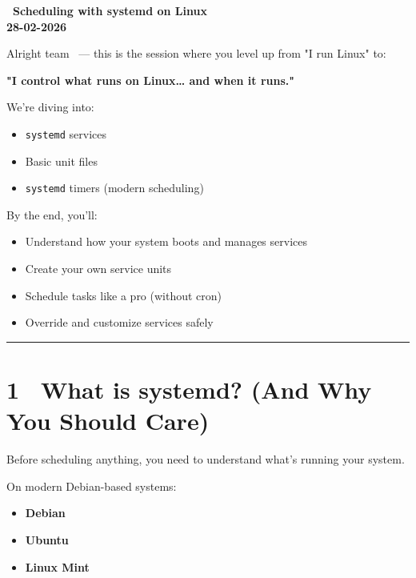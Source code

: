 \documentclass[12pt]{article}
\newcommand{\courseTitle}{Scheduling with systemd on Linux}
\newcommand{\courseDate}{28-02-2026}
\newcommand{\systemdicon}{\faCogs}
\begin{document}
\begin{center}
\headingfont\Huge\bfseries\color{navy}
\systemdicon\ \courseTitle\\[0.5em]
\Large\color{teamred}
\courseDate
\end{center}

\begin{infobox}
Alright team \faUserTie\ — this is the session where you level up from "I run Linux" to:

\begin{center}
\large\textbf{"I control what runs on Linux… and when it runs."}
\end{center}
\end{infobox}

We're diving into:

\begin{itemize}
    \item \texttt{systemd} services
    \item Basic unit files
    \item \texttt{systemd} timers (modern scheduling)
\end{itemize}

By the end, you'll:

\begin{itemize}
    \item Understand how your system boots and manages services
    \item Create your own service units
    \item Schedule tasks like a pro (without cron)
    \item Override and customize services safely
\end{itemize}

\vspace{1em}
\begin{center}
\color{teamred}\rule{0.8\textwidth}{1pt}
\end{center}

\section*{1 \faInfoCircle\ What is systemd? (And Why You Should Care)}

Before scheduling anything, you need to understand what's running your system.

On modern Debian-based systems:

\begin{itemize}
    \item \textbf{Debian}
    \item \textbf{Ubuntu}
    \item \textbf{Linux Mint}
\end{itemize}
\end{document}
